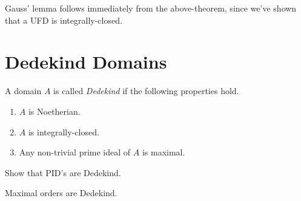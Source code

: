 \documentclass[11pt]{article}
\begin{document}
\begin{remark}
Gauss' lemma follows immediately from the above-theorem, since we've shown that a UFD is integrally-closed.
\end{remark}

\section{Dedekind Domains}

\begin{definition}
A domain $A$ is called \emph{Dedekind} if the following properties hold.

\begin{enumerate}[label = (\roman*)]
\item $A$ is Noetherian.
\item $A$ is integrally-closed.
\item Any non-trivial prime ideal of $A$ is maximal.
\end{enumerate}
\end{definition}

\begin{exercise}
Show that PID's are Dedekind.
\end{exercise}

\begin{exercise}
Maximal orders are Dedekind.
\end{exercise}
\end{document}
